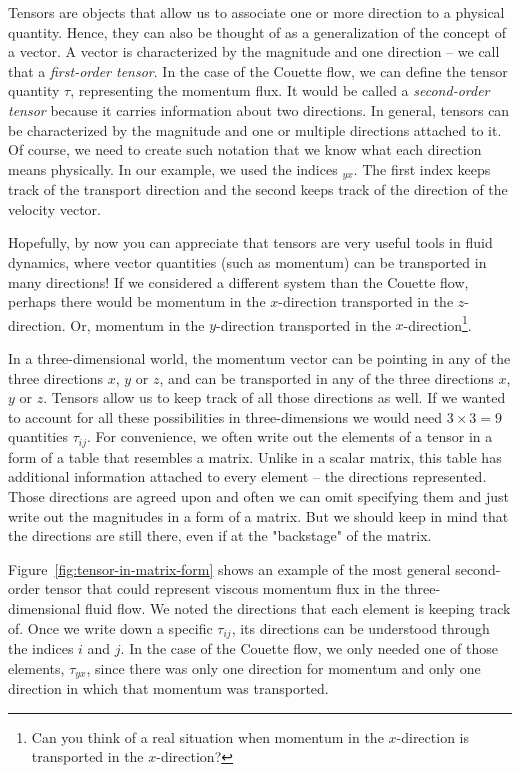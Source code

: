 \documentclass[10pt,twocolumn]{article}
\begin{document}
Tensors are objects that allow us to associate one or more direction to a physical quantity. Hence, they can also be thought of as a generalization of the concept of a vector. A vector is characterized by the magnitude and one direction -- we call that a \textit{first-order tensor}. In the case of the Couette flow, we can define the tensor quantity $\tau$, representing the momentum flux. It would be called a \textit{second-order tensor} because it carries information about two directions. In general, tensors can be characterized by the magnitude and one or multiple directions attached to it. Of course, we need to create such notation that we know what each direction means physically. In our example, we used the indices $_{yx}$. The first index keeps track of the transport direction and the second keeps track of the direction of the velocity vector.

Hopefully, by now you can appreciate that tensors are very useful tools in fluid dynamics, where vector quantities (such as momentum) can be transported in many directions!
If we considered a different system than the Couette flow, perhaps there would be momentum in the $x$-direction transported in the $z$-direction. Or, momentum in the $y$-direction transported in the $x$-direction\footnote{Can you think of a real situation when momentum in the $x$-direction is transported in the $x$-direction?}.

In a three-dimensional world, the momentum vector can be pointing in any of the three directions $x$, $y$ or $z$, and can be transported in any of the three directions $x$, $y$ or $z$. Tensors allow us to keep track of all those directions as well. If we wanted to account for all these possibilities in three-dimensions we would need $3 \times 3 = 9$ quantities $\tau_{ij}$. For convenience, we often write out the elements of a tensor in a form of a table that resembles a matrix. Unlike in a scalar matrix, this table has additional information attached to every element -- the directions represented. Those directions are agreed upon and often we can omit specifying them and just write out the magnitudes in a form of a matrix. But we should keep in mind that the directions are still there, even if at the "backstage" of the matrix.

Figure~\ref{fig:tensor-in-matrix-form} shows an example of the most general second-order tensor that could represent viscous momentum flux in the three-dimensional fluid flow. We noted the directions that each element is keeping track of. Once we write down a specific $\tau_{ij}$, its directions can be understood through the indices $i$ and $j$. In the case of the Couette flow, we only needed one of those elements, $\tau_{yx}$, since there was only one direction for momentum and only one direction in which that momentum was transported.
\end{document}
